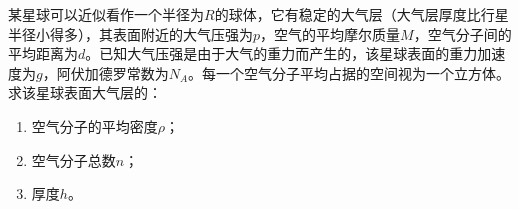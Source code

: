 某星球可以近似看作一个半径为\(R\)的球体，它有稳定的大气层（大气层厚度比行星半径小得多），其表面附近的大气压强为\(p\)，空气的平均摩尔质量\(M\)，空气分子间的平均距离为\(d\)。已知大气压强是由于大气的重力而产生的，该星球表面的重力加速度为\(g\)，阿伏加德罗常数为\(N_A\)。每一个空气分子平均占据的空间视为一个立方体。求该星球表面大气层的：
\begin{enumerate}
    \item 空气分子的平均密度\(\rho\)；
    \item 空气分子总数\(n\)；
    \item 厚度\(h\)。
\end{enumerate}
